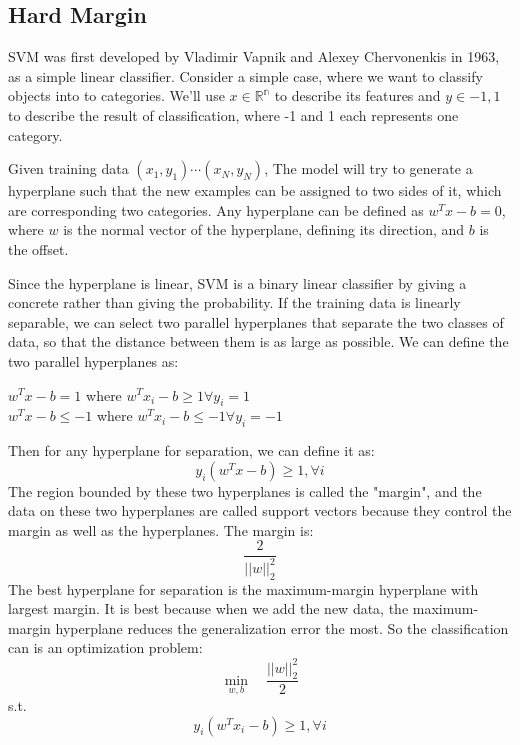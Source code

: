 \documentclass{article}
\begin{document}
\subsection{Hard Margin}
SVM was first developed by Vladimir Vapnik and Alexey Chervonenkis in 1963, as a simple linear classifier. Consider a simple case, where we want to classify objects into to categories. We'll use $x\in\mathbb{R^n}$ to describe its features and $y\in{-1,1}$ to describe the result of classification, where -1 and 1 each represents one category\cite{2}.
\par Given training data $(x_1,y_1)\cdots(x_N,y_N)$, The model will try to generate a hyperplane such that the new examples can be assigned to two sides of it, which are corresponding two categories. Any hyperplane can be defined as $w^Tx-b=0$, where $w$ is the normal vector of the hyperplane, defining its direction, and $b$ is the offset.
\par Since the hyperplane is linear, SVM is a binary linear classifier by giving a concrete rather than giving the probability. If the training data is linearly separable, we can select two parallel hyperplanes that separate the two classes of data, so that the distance between them is as large as possible. We can define the two parallel hyperplanes as:
\begin{center}
    $w^Tx-b=1$ where $w^Tx_i-b\geq1\forall y_i=1$
    \\$w^Tx-b\leq-1$ where $w^Tx_i-b\leq-1\forall y_i=-1$
\end{center}
Then for any hyperplane for separation, we can define it as:
$$y_i(w^Tx-b)\geq1,\forall i$$
The region bounded by these two hyperplanes is called the "margin", and the data on these two hyperplanes are called support vectors because they control the margin as well as the hyperplanes. The margin is:
$$\frac{2}{||w||_2^2}$$
The best hyperplane for separation is the maximum-margin hyperplane with largest margin. It is best because when we add the new data, the maximum-margin hyperplane reduces the generalization error the most. So the classification can is an optimization problem:
$$\min_{w,b}\quad \frac{||w||^2_2}{2}$$
s.t.
$$y_i(w^Tx_i-b)\geq1,\forall i$$
\end{document}
